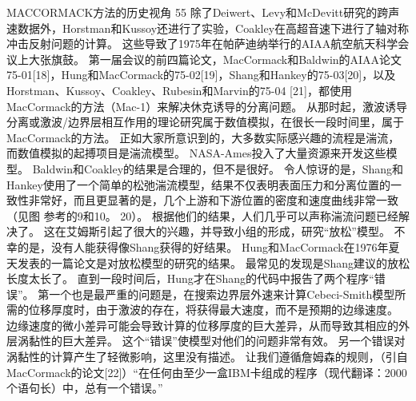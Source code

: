 \documentclass[UTF8,11pt,a4paper,openany,fontset=fandol]{ctexbook}
\begin{document}
MACCORMACK方法的历史视角 55 除了Deiwert、Levy和McDevitt研究的跨声速数据外，Horstman和Kussoy还进行了实验，Coakley在高超音速下进行了轴对称冲击反射问题的计算。 这些导致了1975年在帕萨迪纳举行的AIAA航空航天科学会议上大张旗鼓。 第一届会议的前四篇论文，MacCormack和Baldwin的AIAA论文75-01[18]，Hung和MacCormack的75-02[19]，Shang和Hankey的75-03[20]，以及Horstman、Kussoy、Coakley、Rubesin和Marvin的75-04 [21]，都使用MacCormack的方法（Mac-1）来解决休克诱导的分离问题。 从那时起，激波诱导分离或激波/边界层相互作用的理论研究属于数值模拟，在很长一段时间里，属于MacCormack的方法。 正如大家所意识到的，大多数实际感兴趣的流程是湍流，而数值模拟的起搏项目是湍流模型。 NASA-Ames投入了大量资源来开发这些模型。 Baldwin和Coakley的结果是合理的，但不是很好。 令人惊讶的是，Shang和Hankey使用了一个简单的松弛湍流模型，结果不仅表明表面压力和分离位置的一致性非常好，而且更显著的是，几个上游和下游位置的密度和速度曲线非常一致（见图 参考的9和10。 20）。 根据他们的结果，人们几乎可以声称湍流问题已经解决了。 这在艾姆斯引起了很大的兴趣，并导致小组的形成，研究“放松”模型。 不幸的是，没有人能获得像Shang获得的好结果。 Hung和MacCormack在1976年夏天发表的一篇论文是对放松模型的研究的结果。 最常见的发现是Shang建议的放松长度太长了。 直到一段时间后，Hung才在Shang的代码中报告了两个程序“错误”。 第一个也是最严重的问题是，在搜索边界层外速来计算Cebeci-Smith模型所需的位移厚度时，由于激波的存在，将获得最大速度，而不是预期的边缘速度。 边缘速度的微小差异可能会导致计算的位移厚度的巨大差异，从而导致其相应的外层涡黏性的巨大差异。 这个“错误”使模型对他们的问题非常有效。 另一个错误对涡黏性的计算产生了轻微影响，这里没有描述。 让我们遵循詹姆森的规则，（引自MacCormack的论文[22]）“在任何由至少一盒IBM卡组成的程序（现代翻译：2000个语句长）中，总有一个错误。”
\end{document}
